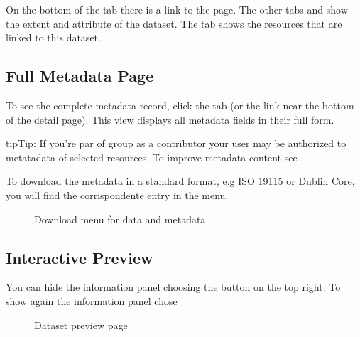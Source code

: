 \documentclass[letterpaper,10pt,english]{sphinxmanual}
\begin{document}
\sphinxAtStartPar
On the bottom of the  tab there is a link to the  page.
The other tabs  and  show the extent and attribute of the dataset.
The tab   shows the resources that are linked to this dataset.


\subsection{Full Metadata Page}
\label{\detokenize{02_find_and_visualize:full-metadata-page}}
\sphinxAtStartPar
To see the complete metadata record, click the  tab (or the  link near the bottom of the detail page). This view displays all metadata
fields in their full form.

\begin{sphinxadmonition}{tip}{Tip:}
\sphinxAtStartPar
If you’re par of  group as a contributor your user may be authorized to
 metatadata of selected resources. To improve metadata content see {\hyperref[\detokenize{03_managing_metadata:metadata-en}]{}}.
\end{sphinxadmonition}

\sphinxAtStartPar
To download the metadata in a standard format, e.g ISO 19115 or Dublin Core, you will find the
corrispondente entry in the  menu.

\begin{figure}[htbp]
\centering
\capstart

\noindent{}
\caption{Download menu for data and metadata}\label{\detokenize{02_find_and_visualize:id15}}\end{figure}


\subsection{Interactive Preview}
\label{\detokenize{02_find_and_visualize:interactive-preview}}
\sphinxAtStartPar
You can hide the information panel choosing the  button on the top right. To show again the
information panel chose

\begin{figure}[htbp]
\centering
\capstart

\noindent{}
\caption{Dataset preview page}\label{\detokenize{02_find_and_visualize:id16}}\end{figure}
\end{document}
